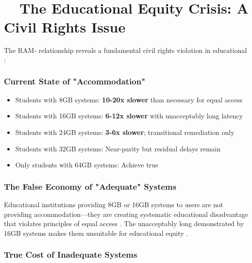 \hypertarget{the-educational-equity-crisis}{}\section{~~The Educational Equity Crisis: A Civil Rights Issue}\label{the-educational-equity-crisis}

The RAM- relationship reveals a fundamental civil rights violation in educational :

\subsubsection{Current State of "Accommodation"}

\begin{itemize}
	\item Students with 8GB systems: \textbf{10-20x slower} than necessary for equal access \supercite{EducationalEquityReport2024}
	\item Students with 16GB systems: \textbf{6-12x slower} with unacceptably long latency \supercite{EducationalEquityReport2024}
	\item Students with 24GB systems: \textbf{3-6x slower}; transitional remediation only \supercite{EducationalEquityReport2024}
	\item Students with 32GB systems: Near-parity but residual delays remain \supercite{EducationalEquityReport2024}
	\item Only students with 64GB systems: Achieve true  \supercite{EducationalEquityReport2024}
\end{itemize}

\subsubsection{The False Economy of "Adequate" Systems}
Educational institutions providing 8GB or 16GB systems to  users are not providing accommodation—they are creating systematic educational disadvantage that violates principles of equal access \supercite{ADA1990, Section504RehabAct}. The unacceptably long  demonstrated by 16GB systems makes them unsuitable for educational equity \supercite{EducationalEquityReport2024}.

\subsubsection{True Cost of Inadequate Systems}

